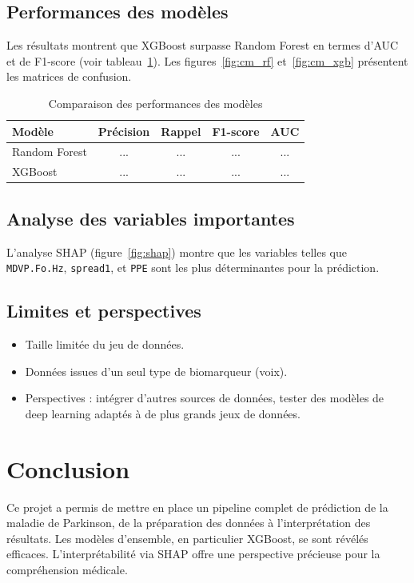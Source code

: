 \documentclass[12pt,a4paper]{report}
\begin{document}
\section{Performances des modèles}
Les résultats montrent que XGBoost surpasse Random Forest en termes d'AUC et de F1-score (voir tableau~\ref{tab:results}). Les figures~\ref{fig:cm_rf} et~\ref{fig:cm_xgb} présentent les matrices de confusion.

\begin{table}[h!]
    \centering
    \begin{tabular}{lcccc}
        \hline
        Modèle & Précision & Rappel & F1-score & AUC \\
        \hline
        Random Forest & ... & ... & ... & ... \\
        XGBoost & ... & ... & ... & ... \\
        \hline
    \end{tabular}
    \caption{Comparaison des performances des modèles}
    \label{tab:results}
\end{table}

\section{Analyse des variables importantes}
L'analyse SHAP (figure~\ref{fig:shap}) montre que les variables telles que \texttt{MDVP.Fo.Hz}, \texttt{spread1}, et \texttt{PPE} sont les plus déterminantes pour la prédiction.

\section{Limites et perspectives}
\begin{itemize}
    \item Taille limitée du jeu de données.
    \item Données issues d'un seul type de biomarqueur (voix).
    \item Perspectives : intégrer d'autres sources de données, tester des modèles de deep learning adaptés à de plus grands jeux de données.
\end{itemize}

\chapter{Conclusion}
Ce projet a permis de mettre en place un pipeline complet de prédiction de la maladie de Parkinson, de la préparation des données à l'interprétation des résultats. Les modèles d'ensemble, en particulier XGBoost, se sont révélés efficaces. L'interprétabilité via SHAP offre une perspective précieuse pour la compréhension médicale.
\end{document}
